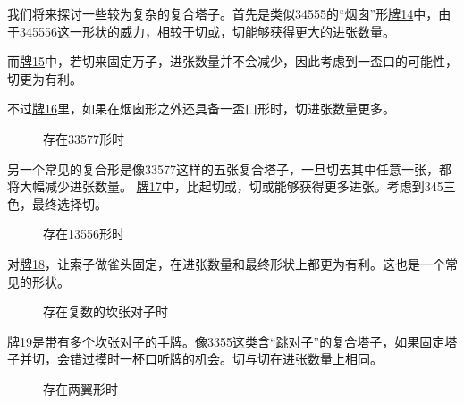我们将来探讨一些较为复杂的复合塔子。首先是类似34555的“烟囱”形\hyperref[lec7:pai14-16]{牌14}中，由于345556这一形状的威力，相较于切或，切能够获得更大的进张数量。

而\hyperref[lec7:pai14-16]{牌15}中，若切来固定万子，进张数量并不会减少，因此考虑到一盃口的可能性，切更为有利。

不过\hyperref[lec7:pai14-16]{牌16}里，如果在烟囱形之外还具备一盃口形时，切进张数量更多。

\par\bigskip\noindent\ignorespaces
\begin{figure}[h]
    \caption{存在33577形时}
    \label{lec7:pai17}
\end{figure}
另一个常见的复合形是像33577这样的五张复合塔子，一旦切去其中任意一张，都将大幅减少进张数量。
\hyperref[lec7:pai17]{牌17}中，比起切或，切或能够获得更多进张。考虑到345三色，最终选择切。



\begin{figure}[h]
    \caption{存在13556形时}
    \label{lec7:pai18}
\end{figure}
对\hyperref[lec7:pai18]{牌18}，让索子做雀头固定，在进张数量和最终形状上都更为有利。这也是一个常见的形状。

\begin{figure}[h]
    \caption{存在复数的坎张对子时}
    \label{lec7:pai19}
\end{figure}\hyperref[lec7:pai19]{牌19}是带有多个坎张对子的手牌。像3355这类含“跳对子”的复合塔子，如果固定塔子并切，会错过摸时一杯口听牌的机会。切与切在进张数量上相同。

\begin{figure}[h]
    \caption{存在两翼形时}
    \label{lec7:pai20-21}
    \par\bigskip
\end{figure}

